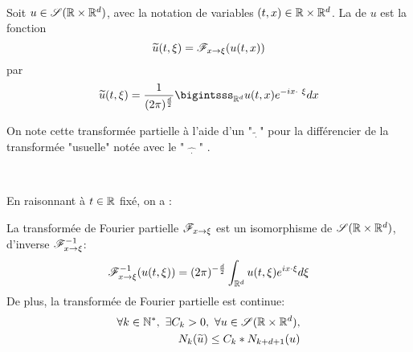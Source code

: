 \documentclass[french,a4paper,10pt]{article}
\begin{document}
            \begin{definition}\label{def:2.3.2}~
            
                Soit $u \in \mathscr{S}(\mathbb{R} \times \mathbb{R}^d)$, avec la notation de variables $(t,x) \in \mathbb{R} \times \mathbb{R}^d$. La  de $u$ est la fonction
                \begin{equation*}
                    \widetilde{u}(t,\xi) = \mathscr{F}_{x \to \xi}(u(t,x))
                \end{equation*}
                par 
                \begin{equation*}
                    \widetilde{u}(t,\xi) = \frac{1}{(2\pi)^\frac{d}{2}} \bigintsss_{\R^d}u(t,x) e^{-ix \cdot \  \xi}dx
                \end{equation*}
            \end{definition}
    
            \begin{noremark}
                On note cette transformée partielle à l'aide d'un "$\underset{\cdot}{\widetilde{~~~}}$" pour la différencier de la transformée "usuelle" notée avec le " $\underset{\cdot}{\widehat{~~~}}$ "  .
            \end{noremark}~

            En raisonnant à $t \in \mathbb{R}$ fixé, on a :

            \begin{proposition}\label{prop:2.3.3}
                La transformée de Fourier partielle $\mathscr{F}_{x\to \xi}$ est un isomorphisme de $\mathscr{S}(\mathbb{R} 
                \times \mathbb{R}^d)$, d'inverse $\mathscr{F}^{-1}_{x \to \xi}$:
                \begin{equation*}
                    \mathscr{F}^{-1}_{x \to \xi}(u(t,\xi)) = (2\pi)^{-\frac{d}{2}} \int_{\mathbb{R}^d} u(t,\xi) e^{ix\cdot \xi} d\xi
                \end{equation*}
                De plus, la transformée de Fourier partielle est continue:
                \begin{equation*}
                    \begin{aligned}
                        \forall k \in \N^*, \ \exists C_k>0, \ \forall u \in \scrS(\R \times \R^d), \\
                        N_k(\widetilde{u}) \leq C_k *N_{k+d+1}(u)
                    \end{aligned}
                \end{equation*}
            \end{proposition}
\end{document}
